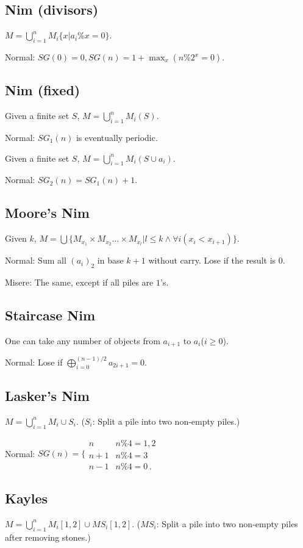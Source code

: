\subsection{Nim (divisors)}
$M=\bigcup_{i=1}^nM_i\{x|a_i\% x=0\}$.

Normal: $SG(0)=0,SG(n)=1+\max_x(n\%2^x=0)$.

\subsection{Nim (fixed)}
Given a finite set $S$, $M=\bigcup_{i=1}^nM_i(S)$.

Normal: $SG_1(n)$ is eventually periodic.

Given a finite set $S$, $M=\bigcup_{i=1}^nM_i(S\cup {a_i})$.

Normal: $SG_2(n)=SG_1(n)+1$.

\subsection{Moore's Nim}
Given $k$, $M=\bigcup\{M_{x_1}\times M_{x_2} \dots\times M_{x_l}|l\le k \wedge\forall i(x_i<x_{i+1})\}$.

Normal: Sum all $(a_i)_2$ in base $k+1$ without carry. Lose if the result is $0$.

Misere: The same, except if all piles are $1$'s.

\subsection{Staircase Nim}
One can take any number of objects from $a_{i+1}$ to $a_i$($i\ge 0$).

Normal: Lose if $\bigoplus_{i=0}^{(n-1)/2}a_{2i+1}=0$.

\subsection{Lasker's Nim}
$M=\bigcup_{i=1}^nM_i\cup S_i$. ($S_i$: Split a pile into two non-empty piles.)

Normal: $SG(n)=\biggl\{\begin{array}{lr}
n & n\%4=1,2\\
n+1 & n\%4=3\\
n-1 & n\%4=0\,.\end{array}$

\subsection{Kayles}
$M=\bigcup_{i=1}^nM_i[1,2]\cup MS_i[1,2]$. ($MS_i$: Split a pile into two non-empty piles after removing stones.)

